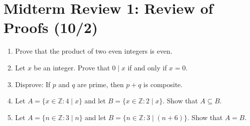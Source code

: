 \documentclass[11pt]{article}
\newcommand{\set}[1]{\{ #1 \}}
\begin{document}

\section*{Midterm Review 1: Review of Proofs (10/2)}
\begin{enumerate}
\item Prove that the product of two even integers is even.
\item Let $x$ be an integer. Prove that $0 \mid x$ if and only if $x=0$.
\item Disprove: If $p$ and $q$ are prime, then $p+q$ is composite.
\item Let $A = \set{x \in \mathbb{Z} : 4 \mid x}$ and let $B = \set{x \in \mathbb{Z} : 2 \mid x}$. Show that $A \subseteq B$.
\item Let $A = \set{n \in \mathbb{Z} : 3 \mid n}$ and let $B = \set{n \in \mathbb{Z} : 3 \mid (n+6)}$. Show that $A=B$.
\end{enumerate}
\end{document}
